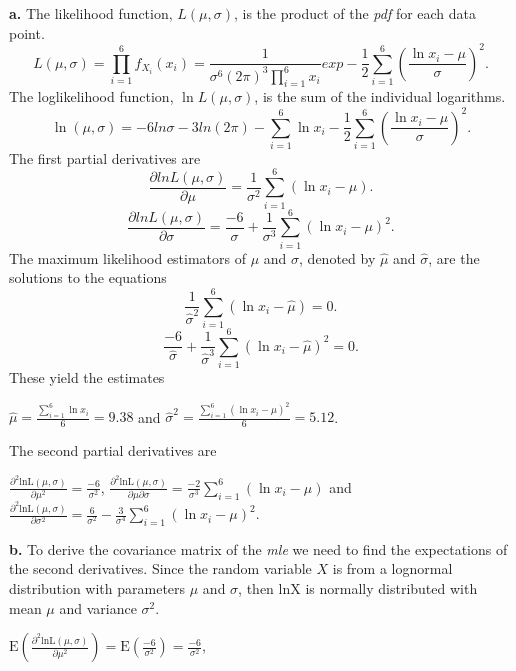 \documentclass[]{book}
\theoremstyle{definition}
\theoremstyle{definition}
\theoremstyle{definition}
\theoremstyle{remark}
\begin{document}
\textbf{a.} The likelihood function, \(L\left( \mu,\sigma \right)\), is
the product of the \emph{pdf} for each data point.
\[L\left( \mu,\sigma \right) = \prod_{i = 1}^{6}{f_{X_{i}}\left( x_{i} \right)} = \frac{1}{\sigma^{6}\left( 2\pi \right)^{3}\prod_{i = 1}^{6}x_{i}}exp - \frac{1}{2}\sum_{i = 1}^{6}\left( \frac{\ln x_{i} - \mu}{\sigma} \right)^{2}.\]
The loglikelihood function, \(\ln L \left( \mu,\sigma \right)\), is the
sum of the individual logarithms.
\[\ln \left( \mu,\sigma \right) = - 6ln\sigma - 3ln\left( 2\pi \right) - \sum_{i = 1}^{6}\ln x_{i} - \frac{1}{2}\sum_{i = 1}^{6}\left( \frac{\ln x_{i} - \mu}{\sigma} \right)^{2}.\]
The first partial derivatives are
\[\frac{\partial lnL\left( \mu,\sigma \right)}{\partial\mu} = \frac{1}{\sigma^{2}}\sum_{i = 1}^{6}\left( \ln x_{i} - \mu \right).\]
\[\frac{\partial lnL\left( \mu,\sigma \right)}{\partial\sigma} = \frac{- 6}{\sigma} + \frac{1}{\sigma^{3}}\sum_{i = 1}^{6}\left( \ln x_{i} - \mu \right)^{2}.\]
The maximum likelihood estimators of \(\mu\) and \(\sigma\), denoted by
\(\hat{\mu}\) and \(\hat{\sigma}\), are the solutions to the equations
\[\frac{1}{{\hat{\sigma}}^{2}}\sum_{i = 1}^{6}\left( \ln x_{i} - \hat{\mu} \right) = 0.\]
\[\frac{- 6}{\hat{\sigma}} + \frac{1}{{\hat{\sigma}}^{3}}\sum_{i = 1}^{6}\left( \ln x_{i} - \hat{\mu} \right)^{2} = 0.\]
These yield the estimates

\(\hat{\mu} = \frac{\sum_{i = 1}^{6}{\ln x_{i}}}{6} = 9.38\) and
\({\hat{\sigma}}^{2} = \frac{\sum_{i = 1}^{6}\left( \ln x_{i} - \hat{\mu} \right)^{2}}{6} = 5.12\).

The second partial derivatives are

\(\frac{\partial^{2}\text{lnL}\left( \mu,\sigma \right)}{\partial\mu^{2}} = \frac{- 6}{\sigma^{2}}\),
\(\frac{\partial^{2}\text{lnL}\left( \mu,\sigma \right)}{\partial\mu\partial\sigma} = \frac{- 2}{\sigma^{3}}\sum_{i = 1}^{6}\left( \ln x_{i} - \mu \right)\)
and
\(\frac{\partial^{2}\text{lnL}\left( \mu,\sigma \right)}{\partial\sigma^{2}} = \frac{6}{\sigma^{2}} - \frac{3}{\sigma^{4}}\sum_{i = 1}^{6}\left( \ln x_{i} - \mu \right)^{2}\).

\textbf{b.} To derive the covariance matrix of the \emph{mle} we need to
find the expectations of the second derivatives. Since the random
variable \(X\) is from a lognormal distribution with parameters \(\mu\)
and \(\sigma\), then \(\text{lnX}\) is normally distributed with mean
\(\mu\) and variance \(\sigma^{2}\).

\(\mathrm{E}\left( \frac{\partial^{2}\text{lnL}\left( \mu,\sigma \right)}{\partial\mu^{2}} \right) = \mathrm{E}\left( \frac{- 6}{\sigma^{2}} \right) = \frac{- 6}{\sigma^{2}}\),
\end{document}
